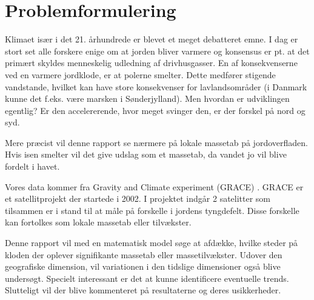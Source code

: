 \section{Problemformulering}
Klimaet især i det 21. århundrede er blevet et meget debatteret emne. 
I dag er stort set alle forskere enige om at jorden bliver varmere og konsensus er pt. at det primært skyldes menneskelig udledning af drivhusgasser. 
En af konsekvenserne ved en varmere jordklode, er at polerne smelter. 
Dette medfører stigende vandstande, hvilket kan have store konsekvenser for lavlandsområder (i Danmark kunne det f.eks. være marsken i Sønderjylland).
Men hvordan er udviklingen egentlig?
Er den accelererende, hvor meget svinger den, er der forskel på nord og syd. 

Mere præcist vil denne rapport se nærmere på lokale massetab på jordoverfladen. 
Hvis isen smelter vil det give udslag som et massetab, da vandet jo vil blive fordelt i havet.

Vores data kommer fra Gravity and Climate experiment (GRACE) \cite{GRACE-data-source}. 
GRACE er et satellitprojekt der startede i 2002. I projektet indgår 2 satelitter som tilsammen er i stand til at måle på forskelle i jordens tyngdefelt.
Disse forskelle kan fortolkes som lokale massetab eller tilvækster.

Denne rapport vil med en matematisk model søge at afdække, hvilke steder på kloden der oplever signifikante massetab eller massetilvækster.
Udover den geografiske dimension, vil variationen i den tidslige dimensioner også blive undersøgt. 
Specielt interessant er det at kunne identificere eventuelle trends.
Slutteligt vil der blive kommenteret på resultaterne og deres usikkerheder.
